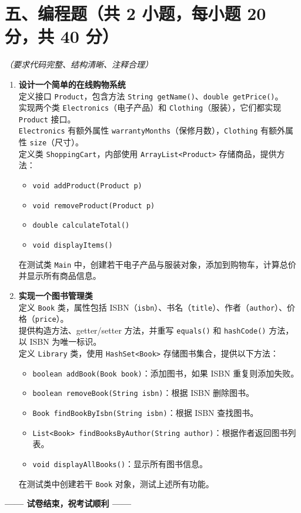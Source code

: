 \documentclass[a3paper, landscape, 11pt, twocolumn]{article}
\begin{document}
\newpage

\section*{五、编程题（共 2 小题，每小题 20 分，共 40 分）}
\textit{（要求代码完整、结构清晰、注释合理）}

\begin{enumerate}[label=\arabic*., itemsep=1em]
	\item \textbf{设计一个简单的在线购物系统} \\
	      定义接口 \texttt{Product}，包含方法 \texttt{String getName()}、\texttt{double getPrice()}。\\
	      实现两个类 \texttt{Electronics}（电子产品）和 \texttt{Clothing}（服装），它们都实现 \texttt{Product} 接口。\\
	      \texttt{Electronics} 有额外属性 \texttt{warrantyMonths}（保修月数），\texttt{Clothing} 有额外属性 \texttt{size}（尺寸）。\\
	      定义类 \texttt{ShoppingCart}，内部使用 \texttt{ArrayList<Product>} 存储商品，提供方法：
	      \begin{itemize}
		      \item \texttt{void addProduct(Product p)}
		      \item \texttt{void removeProduct(Product p)}
		      \item \texttt{double calculateTotal()}
		      \item \texttt{void displayItems()}
	      \end{itemize}
	      在测试类 \texttt{Main} 中，创建若干电子产品与服装对象，添加到购物车，计算总价并显示所有商品信息。
	      \vspace{6cm}

	\item \textbf{实现一个图书管理类} \\
	      定义 \texttt{Book} 类，属性包括 ISBN（\texttt{isbn}）、书名（\texttt{title}）、作者（\texttt{author}）、价格（\texttt{price}）。\\
	      提供构造方法、getter/setter 方法，并重写 \texttt{equals()} 和 \texttt{hashCode()} 方法，以 ISBN 为唯一标识。\\
	      定义 \texttt{Library} 类，使用 \texttt{HashSet<Book>} 存储图书集合，提供以下方法：
	      \begin{itemize}
		      \item \texttt{boolean addBook(Book book)}：添加图书，如果 ISBN 重复则添加失败。
		      \item \texttt{boolean removeBook(String isbn)}：根据 ISBN 删除图书。
		      \item \texttt{Book findBookByIsbn(String isbn)}：根据 ISBN 查找图书。
		      \item \texttt{List<Book> findBooksByAuthor(String author)}：根据作者返回图书列表。
		      \item \texttt{void displayAllBooks()}：显示所有图书信息。
	      \end{itemize}
	      在测试类中创建若干 \texttt{Book} 对象，测试上述所有功能。
	      \vspace{6cm}
\end{enumerate}

\begin{center}
	\textbf{—— 试卷结束，祝考试顺利 ——}
\end{center}
\end{document}
